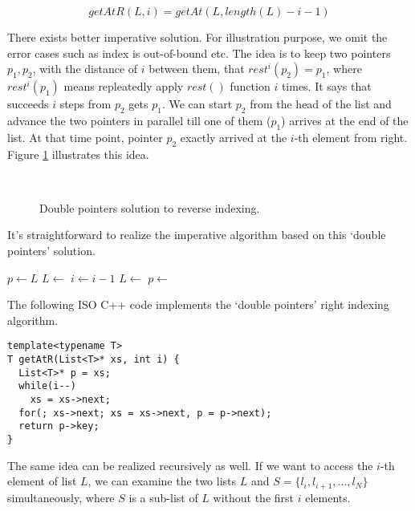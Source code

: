 \documentclass{article}
\begin{document}
\[
  getAtR(L, i) = getAt(L, length(L) - i -1)
\]

There exists better imperative solution. For illustration purpose, we omit the error cases such
as index is out-of-bound etc. The idea is to keep two pointers $p_1, p_2$, with the distance
of $i$ between them, that $rest^i(p_2) = p_1$, where $rest^i(p_1)$ means repleatedly apply $rest()$ function
$i$ times. It says that succeeds $i$ steps from $p_2$ gets $p_1$. We can start $p_2$ from the head
of the list and advance the two pointers in parallel till one of them ($p_1$) arrives at the end
of the list. At that time point, pointer $p_2$ exactly arrived at the $i$-th element from right.
Figure \ref{fig:list-rindex} illustrates this idea.

\begin{figure}[htbp]
    \centering
     \\
    \caption{Double pointers solution to reverse indexing.} \label{fig:list-rindex}
\end{figure}

It's straightforward to realize the imperative algorithm based on this `double pointers' solution.

\begin{algorithmic}
  \State $p \gets L$
    \State $L \gets $ 
    \State $i \gets i - 1$
  \EndWhile
    \State $L \gets$ 
    \State $p \gets$ 
  \EndWhile
  \State \Return {}
\EndFunction
\end{algorithmic}

The following ISO C++ code implements the `double pointers' right indexing algorithm.

\lstset{language=C++}
\begin{lstlisting}
template<typename T>
T getAtR(List<T>* xs, int i) {
  List<T>* p = xs;
  while(i--)
    xs = xs->next;
  for(; xs->next; xs = xs->next, p = p->next);
  return p->key;
}
\end{lstlisting}

The same idea can be realized recursively as well. If we want to access the $i$-th element of list $L$, we
can examine the two lists $L$ and $S=\{l_i, l_{i+1}, ..., l_N\}$ simultaneously, where $S$ is a sub-list
of $L$ without the first $i$ elements.
\end{document}
